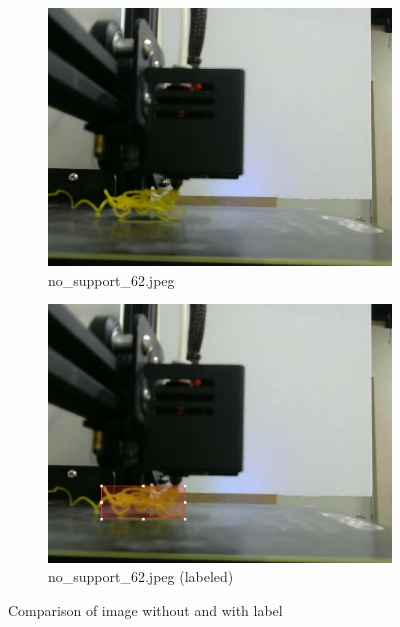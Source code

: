 \documentclass[12pt,a4paper]{article}
\begin{document}
\begin{figure}[h]
    \centering
    \begin{subfigure}[b]{0.45\textwidth}
        \centering
        \includegraphics[width=\textwidth]{no_support_62.jpg}
        \caption{no\_support\_62.jpeg \cite{onlineOpenSource2}}
        \label{fig:image1}
    \end{subfigure}
    \begin{subfigure}[b]{0.45\textwidth}
        \centering
        \includegraphics[width=\textwidth]{LabelByMakeSens.png}
        \caption{no\_support\_62.jpeg (labeled)\cite{onlineOpenSource2}}
        \label{fig:image2}
    \end{subfigure}
    \hfill
    \caption{Comparison of image without and with label}
    \label{fig:test}
\end{figure}
\end{document}
